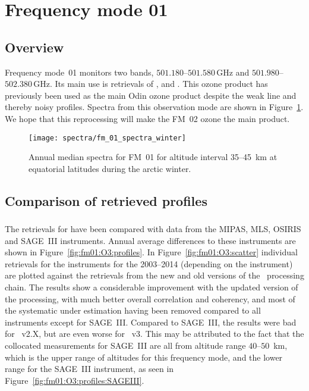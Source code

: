 \section{Frequency mode 01}
\label{sec:fm01}

\subsection{Overview}
\label{sec:fm01:overview}
Frequency mode~01 monitors two bands, $501.180$--$501.580\,\mathrm{GHz}$ and
$501.980$--$502.380\,\mathrm{GHz}$. Its main use is retrievals of ,
 and . This ozone product has previously been used as
the main Odin ozone product despite the weak line and thereby noisy profiles.
Spectra from this observation mode are shown in Figure~\ref{fig:spectra:01}.
We hope that this reprocessing will make the FM~02 ozone the main product.


\begin{figure}[ht]
    \centering
    \texttt{[image: spectra/fm\_01\_spectra\_winter]}
    \caption{Annual median spectra for FM~01 for altitude interval 35--45~km at
        equatorial latitudes during the arctic winter.
    }\label{fig:spectra:01}
\end{figure}


\subsection{Comparison of retrieved profiles}
\label{sec:fm01:comparison}



\subsubsection{}
\label{sec:fm01:comparison:O3}
The retrievals for  have been compared with data from the MIPAS, MLS,
OSIRIS and SAGE~III instruments. Annual average differences to these
instruments are shown in Figure~\ref{fig:fm01:O3:profiles}. In
Figure~\ref{fig:fm01:O3:scatter} individual retrievals for the instruments for
the 2003--2014 (depending on the instrument)  are plotted against the
retrievals from the new and old versions of the \smr\ processing chain. The
results show a considerable improvement with the updated version of the
processing, with much better overall correlation and coherency, and most of the
systematic under estimation having been removed compared to all instruments
except for SAGE~III.  Compared to SAGE~III, the results were bad for \smr~v2.X,
but are even worse for \smr~v3. This may be attributed to the fact that the
collocated measurements for SAGE~III are all from altitude range $40$--$50$~km,
which is the upper range of altitudes for this frequency mode, and the lower
range for the SAGE~III instrument, as seen in
Figure~\ref{fig:fm01:O3:profiles:SAGEIII}.

